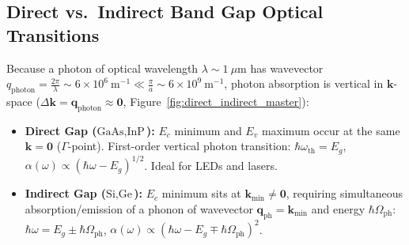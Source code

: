 \documentclass[11pt,a4paper]{article}
\newcommand{\vb}[1]{\mathbf{#1}}
\newcommand{\hb}{\hbar}
\newcommand{\kk}{\mathbf{k}}
\begin{document}
\subsection{Direct vs.\ Indirect Band Gap Optical Transitions}
Because a photon of optical wavelength $\lambda \sim 1\ \mu\mathrm{m}$ has wavevector $q_{\mathrm{photon}} = \frac{2\pi}{\lambda} \sim 6 \times 10^6\ \mathrm{m^{-1}} \ll \frac{\pi}{a} \sim 6 \times 10^9\ \mathrm{m^{-1}}$, photon absorption is vertical in $\kk$-space ($\Delta\kk = \vb{q}_{\mathrm{photon}} \approx \vb{0}$, Figure~\ref{fig:direct_indirect_master}):
\begin{itemize}
    \item \textbf{Direct Gap ($\text{GaAs}, \text{InP}$):} $E_c$ minimum and $E_v$ maximum occur at the same $\kk = \vb{0}$ ($\Gamma$-point). First-order vertical photon transition: $\hb\omega_{\mathrm{th}} = E_g$, $\alpha(\omega) \propto (\hb\omega - E_g)^{1/2}$. Ideal for LEDs and lasers.
    \item \textbf{Indirect Gap ($\text{Si}, \text{Ge}$):} $E_c$ minimum sits at $\kk_{\min} \neq \vb{0}$, requiring simultaneous absorption/emission of a phonon of wavevector $\vb{q}_{\mathrm{ph}} = \kk_{\min}$ and energy $\hb\Omega_{\mathrm{ph}}$: $\hb\omega = E_g \pm \hb\Omega_{\mathrm{ph}}$, $\alpha(\omega) \propto (\hb\omega - E_g \mp \hb\Omega_{\mathrm{ph}})^2$.
\end{itemize}
\end{document}
